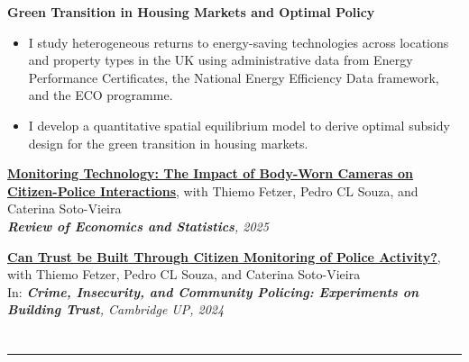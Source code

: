 \documentclass[letterpaper, 11pt]{article}
\begin{document}
\vspace{-0.1cm}

 \textbf{Green Transition in Housing Markets and Optimal Policy}
  \vspace{-0.2cm}
  \begin{itemize}
   \item I study heterogeneous returns to energy-saving technologies across locations and property types in the UK using administrative data from Energy Performance Certificates, the National Energy Efficiency Data framework, and the ECO programme.
   \vspace{-0.2cm}
   \item I develop a quantitative spatial equilibrium model to derive optimal subsidy design for the green transition in housing markets.
  \end{itemize}

\vspace{-0.1cm}

\noindent
[Published]  \href{https://doi.org/10.1162/rest.a.286}{\textbf{Monitoring Technology: The Impact of Body-Worn Cameras on Citizen-Police Interactions}}, with Thiemo Fetzer, Pedro CL Souza, and Caterina Soto-Vieira \\
	\textit{\textbf{Review of Economics and Statistics}, 2025}\\
\vspace{-0.2cm}

\noindent
[Published] \href{https://doi.org/10.1017/9781009235914}{\textbf{Can Trust be Built Through Citizen Monitoring of Police Activity?}}, \\with Thiemo Fetzer, Pedro CL Souza, and Caterina Soto-Vieira \\
In: \textit{\textbf{Crime, Insecurity, and Community Policing: Experiments on Building Trust}, Cambridge UP, 2024}

\vspace{-0.2cm}




\section*{\color{OxfordBlue}{Professional Experience}}

\vspace{-0.6cm}
\noindent\rule{\textwidth}{0.4pt}

\vspace{0.1cm}
\end{document}
